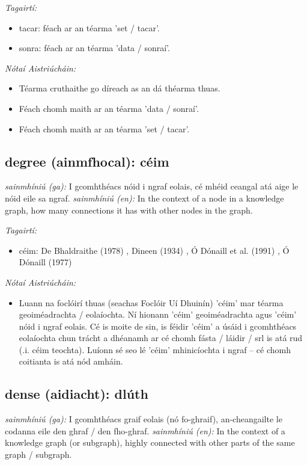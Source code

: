 \documentclass{article}
\begin{document}
 \noindent \textit{Tagairtí:}
\begin{itemize}
	\item tacar: féach ar an téarma 'set / tacar'.
	\item sonra: féach ar an téarma 'data / sonraí'.
\end{itemize}

 \noindent \textit{Nótaí Aistriúcháin:}
\begin{itemize}
	\item Téarma cruthaithe go díreach as an dá théarma thuas.
	\item Féach chomh maith ar an téarma 'data / sonraí'.
	\item Féach chomh maith ar an téarma 'set / tacar'.
\end{itemize}


\subsection*{degree (ainmfhocal): céim} 
 \noindent \textit{sainmhíniú (ga):} I gcomhthéacs nóid i ngraf eolais, cé mhéid ceangal atá aige le nóid eile sa ngraf.
\newline\newline
 \noindent \textit{sainmhíniú (en):} In the context of a node in a knowledge graph, how many connections it has with other nodes in the graph.
\newline

 \noindent \textit{Tagairtí:}
\begin{itemize}
	\item céim: De Bhaldraithe (1978) \cite{de-bhaldraithe}, Dineen (1934) \cite{dineen}, Ó Dónaill et al. (1991) \cite{focloir-beag}, Ó Dónaill (1977) \cite{odonaill}
\end{itemize}

 \noindent \textit{Nótaí Aistriúcháin:}
\begin{itemize}
	\item Luann na foclóirí thuas (seachas Foclóir Uí Dhuinín) 'céim' mar téarma geoiméadrachta / eolaíochta. Ní hionann 'céim' geoiméadrachta agus 'céim' nóid i ngraf eolais. Cé is moite de sin, is féidir 'céim' a úsáid i gcomhthéacs eolaíochta chun trácht a dhéanamh ar cé chomh fásta / láidir / srl is atá rud (.i. céim teochta). Luíonn sé seo lé 'céim' mhinicíochta i ngraf -- cé chomh coitianta is atá nód amháin.
\end{itemize}


\subsection*{dense (aidiacht): dlúth} 
 \noindent \textit{sainmhíniú (ga):} I gcomhthéacs graif eolais (nó fo-ghraif), an-cheangailte le codanna eile den ghraf / den fho-ghraf.
\newline\newline
 \noindent \textit{sainmhíniú (en):} In the context of a knowledge graph (or subgraph), highly connected with other parts of the same graph / subgraph.
\newline
\end{document}
